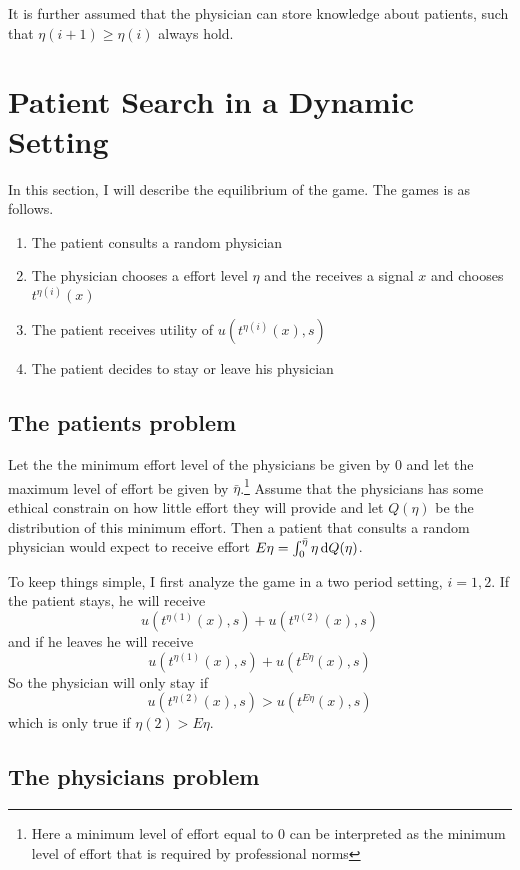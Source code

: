 It is further assumed that the physician can store knowledge about patients, such that $\eta(i+1)\geq\eta(i)$ always hold. 

\section{Patient Search in a Dynamic Setting} %
\label{sec:patient_search_in_a_dynamic_setting}
In this section, I will describe the equilibrium of the game. The games is as follows. 
\begin{enumerate}
    \item The patient consults a random physician
    \item The physician chooses a effort level $\eta$ and the receives a signal $x$ and chooses $t^{\eta(i)}(x)$
    \item The patient receives utility of $u(t^{\eta(i)}(x),s)$
    \item The patient decides to stay or leave his physician
\end{enumerate}

\subsection{The patients problem} %
\label{sub:the_patients_problem}
Let the the minimum effort level of the physicians be given by $0$ and let the maximum level of effort be given by $\bar{\eta}$.\footnote{Here a minimum level of effort equal to 0 can be interpreted as the minimum level of effort that is required by professional norms} Assume that the physicians has some ethical constrain on how little effort they will provide and let $Q(\eta)$ be the distribution of this minimum effort. Then a patient that consults a random physician would expect to receive effort $E\eta=\int_0^{\bar{\eta}}\eta \dif Q(\eta)$. 

To keep things simple, I first analyze the game in a two period setting, $i=1,2$. If the patient stays, he will receive 
\[
    u(t^{\eta(1)}(x),s)+u(t^{\eta(2)}(x),s)
\]
 and if he leaves he will receive
 \[
     u(t^{\eta(1)}(x),s)+u(t^{E\eta}(x),s)
 \]
 So the physician will only stay if 
 \[
    u(t^{\eta(2)}(x),s)>u(t^{E\eta}(x),s)
 \]
 which is only true if $\eta(2)>E\eta$.

\subsection{The physicians problem} %
\label{sub:the_physicians_problem}

